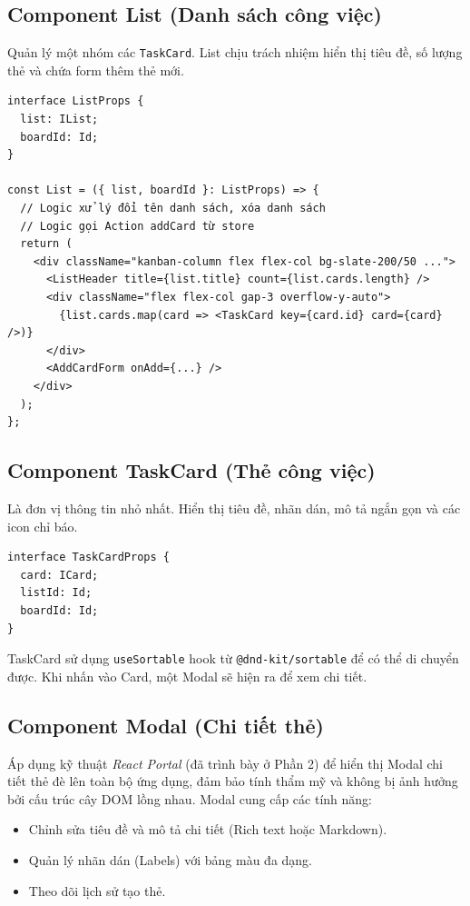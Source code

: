 \subsection{Component List (Danh sách công việc)}
Quản lý một nhóm các \texttt{TaskCard}. List chịu trách nhiệm hiển thị tiêu đề, số lượng thẻ và chứa form thêm thẻ mới.
\begin{Verbatim}
interface ListProps {
  list: IList;
  boardId: Id;
}

const List = ({ list, boardId }: ListProps) => {
  // Logic xử lý đổi tên danh sách, xóa danh sách
  // Logic gọi Action addCard từ store
  return (
    <div className="kanban-column flex flex-col bg-slate-200/50 ...">
      <ListHeader title={list.title} count={list.cards.length} />
      <div className="flex flex-col gap-3 overflow-y-auto">
        {list.cards.map(card => <TaskCard key={card.id} card={card} />)}
      </div>
      <AddCardForm onAdd={...} />
    </div>
  );
};
\end{Verbatim}

\subsection{Component TaskCard (Thẻ công việc)}
Là đơn vị thông tin nhỏ nhất. Hiển thị tiêu đề, nhãn dán, mô tả ngắn gọn và các icon chỉ báo.
\begin{Verbatim}
interface TaskCardProps {
  card: ICard;
  listId: Id;
  boardId: Id;
}
\end{Verbatim}
TaskCard sử dụng \texttt{useSortable} hook từ \texttt{@dnd-kit/sortable} để có thể di chuyển được. Khi nhấn vào Card, một Modal sẽ hiện ra để xem chi tiết.

\subsection{Component Modal (Chi tiết thẻ)}
Áp dụng kỹ thuật \textit{React Portal} (đã trình bày ở Phần 2) để hiển thị Modal chi tiết thẻ đè lên toàn bộ ứng dụng, đảm bảo tính thẩm mỹ và không bị ảnh hưởng bởi cấu trúc cây DOM lồng nhau. Modal cung cấp các tính năng:
\begin{itemize}
    \item Chỉnh sửa tiêu đề và mô tả chi tiết (Rich text hoặc Markdown).
    \item Quản lý nhãn dán (Labels) với bảng màu đa dạng.
    \item Theo dõi lịch sử tạo thẻ.
\end{itemize}


